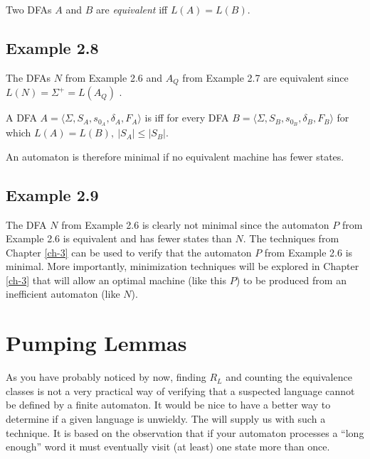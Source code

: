 \begin{dfn}\label{dfn-2.6}
Two DFAs $A$ and $B$ are \emph{equivalent} iff $L(A) = L(B)$.
\end{dfn}

\subsection*{Example 2.8}

The DFAs $N$ from Example 2.6 and $A_Q$ from Example 2.7 are equivalent since
$L(N) = \Sigma^+ = L(A_Q)$ .

\begin{dfn}\label{dfn-2.7}
A DFA $A=\langle\Sigma,S_A,s_{0_A},\delta_A,F_A\rangle$ is \emph{}
iff for every DFA $B=\langle\Sigma,S_B,s_{0_B},\delta_B,F_B\rangle$ for which
$L(A) = L(B),\ |S_A| \leq |S_B|$.
\end{dfn}

An automaton is therefore minimal if no equivalent machine has fewer states.

\subsection*{Example 2.9}

The DFA $N$ from Example 2.6 is clearly not minimal since the automaton $P$
from Example 2.6 is equivalent and has fewer states than $N$. The techniques
from Chapter \ref{ch-3} can be used to verify that the automaton $P$ from Example 2.6
is minimal. More importantly, minimization techniques will be explored in
Chapter \ref{ch-3} that will allow an optimal machine (like this $P$) to be produced
from an inefficient automaton (like $N$).

\section{Pumping Lemmas}\label{sec-2.3}

As you have probably noticed by now, finding $R_L$ and counting the equivalence
classes is not a very practical way of verifying that a suspected language
cannot be defined by a finite automaton. It would be nice to have a better way
to determine if a given language is unwieldy. The \emph{}
will supply us with such a technique. It is based on the observation that if
your automaton processes a ``long enough'' word it must eventually visit (at
least) one state more than once.

